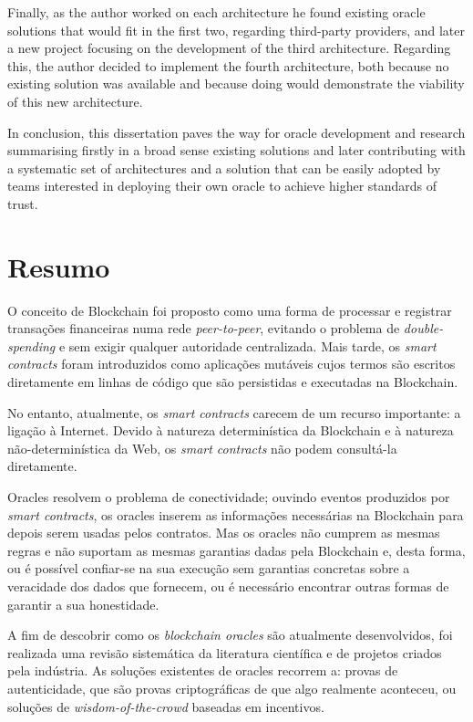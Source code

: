 Finally, as the author worked on each architecture he found existing oracle solutions that would fit in the first two, regarding third-party providers, and later a new project focusing on the development of the third architecture. Regarding this, the author decided to implement the fourth architecture, both because no existing solution was available and because doing would demonstrate the viability of this new architecture.

In conclusion, this dissertation paves the way for oracle development and research summarising firstly in a broad sense existing solutions and later contributing with a systematic set of architectures and a solution that can be easily adopted by teams interested in deploying their own oracle to achieve higher standards of trust.


\chapter*{Resumo}


O conceito de Blockchain foi proposto como uma forma de processar e registrar transações financeiras numa rede \textit{peer-to-peer}, evitando o problema de \textit{double-spending} e sem exigir qualquer autoridade centralizada. Mais tarde, os \textit{smart contracts} foram introduzidos como aplicações mutáveis cujos termos são escritos diretamente em linhas de código que são persistidas e executadas na Blockchain.


No entanto, atualmente, os \textit{smart contracts} carecem de um recurso importante: a ligação à Internet. Devido à natureza determinística da Blockchain e à natureza não-determinística da Web, os \textit{smart contracts} não podem consultá-la diretamente.

Oracles resolvem o problema de conectividade; ouvindo eventos produzidos por \textit{smart contracts}, os oracles inserem as informações necessárias na Blockchain para depois serem usadas pelos contratos. Mas os oracles não cumprem as mesmas regras e não suportam as mesmas garantias dadas pela Blockchain e, desta forma, ou é possível confiar-se na sua execução sem garantias concretas sobre a veracidade dos dados que fornecem, ou é necessário encontrar outras formas de garantir a sua honestidade.

A fim de descobrir como os \textit{blockchain oracles} são atualmente desenvolvidos, foi realizada uma revisão sistemática da literatura científica e de projetos criados pela indústria. As soluções existentes de oracles recorrem a: provas de autenticidade, que são provas criptográficas de que algo realmente aconteceu, ou soluções de \textit{wisdom-of-the-crowd} baseadas em incentivos.

